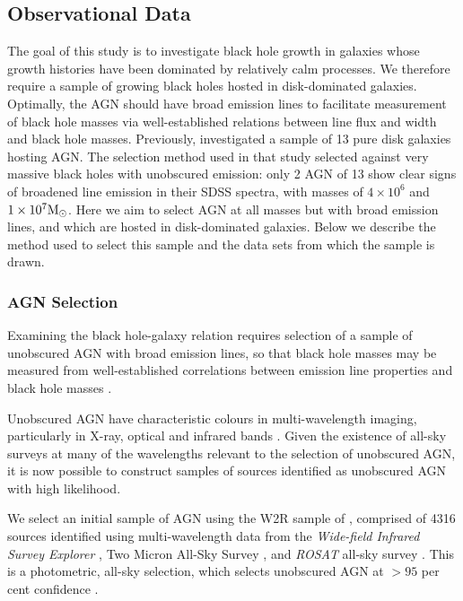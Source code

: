 %
%
\subsection{Observational Data}\label{sec:data}
%
%

The goal of this study is to investigate black hole growth in galaxies whose growth histories have been dominated by relatively calm processes. We therefore require a sample of growing black holes hosted in disk-dominated galaxies. Optimally, the AGN should have broad emission lines to facilitate measurement of black hole masses via well-established relations between line flux and width and black hole masses. Previously, \citet{simmons13} investigated a sample of 13 pure disk galaxies hosting AGN. The selection method used in that study selected against very massive black holes with unobscured emission: only 2 AGN of 13 show clear signs of broadened line emission in their SDSS spectra, with masses of $4 \times 10^6$ and $1 \times 10^7 \rm{M}_{\odot} $. Here we aim to select AGN at all masses but with broad emission lines, and which are hosted in disk-dominated galaxies. Below we describe the method used to select this sample and the data sets from which the sample is drawn.

\subsubsection{AGN Selection}

Examining the black hole-galaxy relation requires selection of a sample of unobscured AGN with broad emission lines, so that black hole masses may be measured from well-established correlations between emission line properties and black hole masses {\notebsm \citep[e.g.,][]{jiang11a,xiao11}}. 

Unobscured AGN have characteristic colours in multi-wavelength imaging, particularly in X-ray, optical and infrared bands \citep{sdss_qso_color_selection,xray_agn_selection,ir_agn_selection}. Given the existence of all-sky surveys at many of the wavelengths relevant to the selection of unobscured AGN, it is now possible to construct samples of sources identified as unobscured AGN with high likelihood.

We select an initial sample of AGN using the W2R sample of \citet{edelson12}, comprised of 4316 sources identified using multi-wavelength data from the \emph{Wide-field Infrared Survey Explorer} \citep[\emph{WISE};][]{wright10}, Two Micron All-Sky Survey \citep[2MASS;][]{skrutskie06}, and \emph{ROSAT} all-sky survey \citep[RASS;][]{voges99}. This is a photometric, all-sky selection, which selects unobscured AGN at $>95$ per cent confidence \citet{edelson12}.



